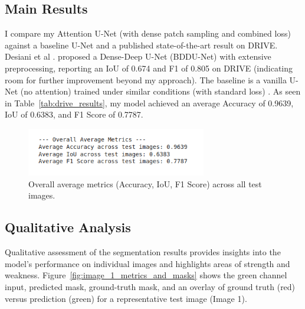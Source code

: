\documentclass[11pt]{article}
\begin{document}
\subsection{Main Results}
\label{sec:Results}
I compare my Attention U-Net (with dense patch sampling and combined loss) against a baseline U-Net and a published state-of-the-art result on DRIVE. Desiani et al \cite{desiani2023denoised}. proposed a Dense-Deep U-Net (BDDU-Net) with extensive preprocessing, reporting an IoU of 0.674 and F1 of 0.805 on DRIVE (indicating room for further improvement beyond my approach). The baseline is a vanilla U-Net (no attention) trained under similar conditions (with standard loss) \cite{he2022curv}. As seen in Table~\ref{tab:drive_results}, my model achieved an average Accuracy of 0.9639, IoU of 0.6383, and F1 Score of 0.7787.

\begin{figure}[h!]
    \centering
    \includegraphics[width=0.7\textwidth]{figure_overall_average_metrics.png}
    \caption{Overall average metrics (Accuracy, IoU, F1 Score) across all test images.}
    \label{fig:overall_average_metrics}
\end{figure}

\subsection{Qualitative Analysis}
\label{sec:QualitativeAnalysis}

Qualitative assessment of the segmentation results provides insights into the model's performance on individual images and highlights areas of strength and weakness. Figure~\ref{fig:image_1_metrics_and_masks} shows the green channel input, predicted mask, ground-truth mask, and an overlay of ground truth (red) versus prediction (green) for a representative test image (Image 1).
\end{document}

